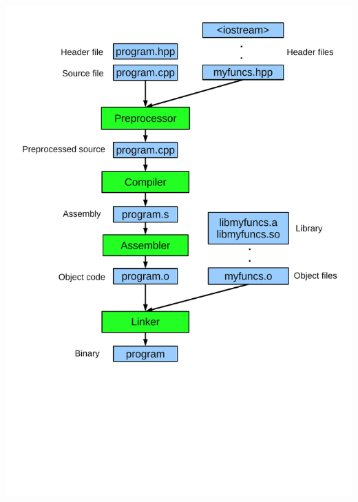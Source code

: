 \documentclass{slides}
\begin{document}
\begin{frame}
\begin{columns}[T,onlytextwidth]
    \includegraphics[height=1.1\textheight]{compilation}
  \end{columns}
\end{frame}
\end{document}
